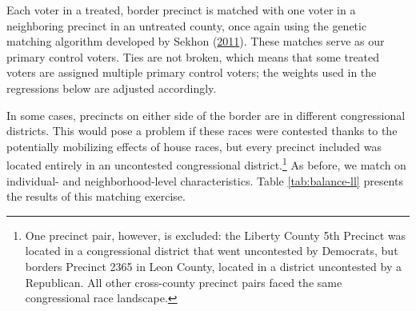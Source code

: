 \documentclass[
  12pt,
]{article}
\begin{document}
Each voter in a treated, border precinct is matched with one voter in a neighboring precinct in an untreated county, once again using the genetic matching algorithm developed by Sekhon (\protect\hyperlink{ref-Sekhon2011}{2011}). These matches serve as our primary control voters. Ties are not broken, which means that some treated voters are assigned multiple primary control voters; the weights used in the regressions below are adjusted accordingly.

In some cases, precincts on either side of the border are in different congressional districts. This would pose a problem if these races were contested thanks to the potentially mobilizing effects of house races, but every precinct included was located entirely in an uncontested congressional district.\footnote{One precinct pair, however, is excluded: the Liberty County 5th Precinct was located in a congressional district that went uncontested by Democrats, but borders Precinct 2365 in Leon County, located in a district uncontested by a Republican. All other cross-county precinct pairs faced the same congressional race landscape.} As before, we match on individual- and neighborhood-level characteristics. Table \ref{tab:balance-ll} presents the results of this matching exercise.
\end{document}
